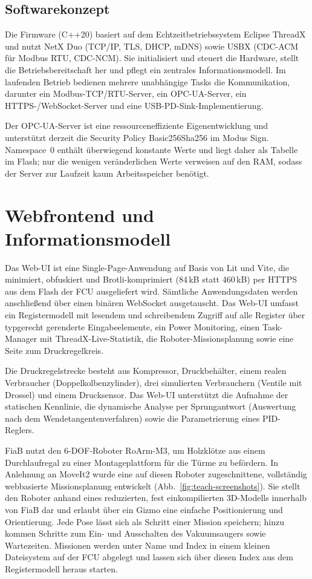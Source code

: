 \documentclass[]{article}%
\begin{document}
\subsection{Softwarekonzept}
Die Firmware (C++20) basiert auf dem Echtzeitbetriebssystem Eclipse ThreadX \cite{threadx} und nutzt NetX Duo (TCP/IP, TLS, DHCP, mDNS) sowie USBX (CDC-ACM für Modbus RTU, CDC-NCM). Sie initialisiert und steuert die Hardware, stellt die Betriebsbereitschaft her und pflegt ein zentrales Informationsmodell. Im laufenden Betrieb bedienen mehrere unabhängige Tasks die Kommunikation, darunter ein Modbus-TCP/RTU-Server, ein OPC-UA-Server, ein HTTPS-/WebSocket-Server und eine USB-PD-Sink-Implementierung.

Der OPC-UA-Server ist eine ressourceneffiziente Eigenentwicklung und unterstützt derzeit die Security Policy Basic256Sha256 im Modus Sign. Namespace~0 enthält überwiegend konstante Werte und liegt daher als Tabelle im Flash; nur die wenigen veränderlichen Werte verweisen auf den RAM, sodass der Server zur Laufzeit kaum Arbeitsspeicher benötigt.

\section{Webfrontend und Informationsmodell}
Das Web-UI ist eine Single-Page-Anwendung auf Basis von Lit und Vite, die minimiert, obfuskiert und Brotli-komprimiert (84\,kB statt 460\,kB) per HTTPS aus dem Flash der FCU ausgeliefert wird. Sämtliche Anwendungsdaten werden anschließend über einen binären WebSocket ausgetauscht. Das Web-UI umfasst ein Registermodell mit lesendem und schreibendem Zugriff auf alle Register über typgerecht gerenderte Eingabeelemente, ein Power Monitoring, einen Task-Manager mit ThreadX-Live-Statistik, die Roboter-Missionsplanung sowie eine Seite zum Druckregelkreis.

Die Druckregelstrecke besteht aus Kompressor, Druckbehälter, einem realen Verbraucher (Doppelkolbenzylinder), drei simulierten Verbrauchern (Ventile mit Drossel) und einem Drucksensor. Das Web-UI unterstützt die Aufnahme der statischen Kennlinie, die dynamische Analyse per Sprungantwort (Auswertung nach dem Wendetangentenverfahren) sowie die Parametrierung eines PID-Reglers.

FiaB nutzt den 6-DOF-Roboter RoArm-M3, um Holzklötze aus einem Durchlaufregal zu einer Montageplattform für die Türme zu befördern. In Anlehnung an MoveIt2 wurde eine auf diesen Roboter zugeschnittene, vollständig webbasierte Missionsplanung entwickelt (Abb.~\ref{fig:teach-screenshots}). Sie stellt den Roboter anhand eines reduzierten, fest einkompilierten 3D-Modells innerhalb von FiaB dar und erlaubt über ein Gizmo eine einfache Positionierung und Orientierung. Jede Pose lässt sich als Schritt einer Mission speichern; hinzu kommen Schritte zum Ein- und Ausschalten des Vakuumsaugers sowie Wartezeiten. Missionen werden unter Name und Index in einem kleinen Dateisystem auf der FCU abgelegt und lassen sich über diesen Index aus dem Registermodell heraus starten.
\end{document}
